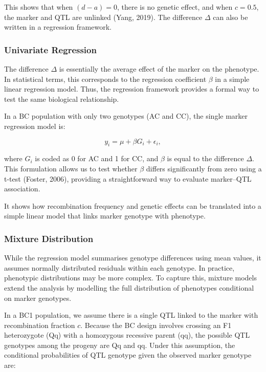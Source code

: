 \documentclass[
  letterpaper,
  DIV=11,
  numbers=noendperiod]{scrartcl}
\begin{document}
This shows that when \((d-a)=0\), there is no genetic effect, and when
\(c=0.5\), the marker and QTL are unlinked (Yang, 2019). The difference
\(\Delta\) can also be written in a regression framework.

\subsubsection{Univariate Regression}\label{univariate-regression}

The difference \(\Delta\) is essentially the average effect of the
marker on the phenotype. In statistical terms, this corresponds to the
regression coefficient \(\beta\) in a simple linear regression model.
Thus, the regression framework provides a formal way to test the same
biological relationship.

In a BC population with only two genotypes (AC and CC), the single
marker regression model is:

\[
y_i = \mu + \beta G_i + \epsilon_i,
\]

where \(G_i\) is coded as 0 for AC and 1 for CC, and \(\beta\) is equal
to the difference \(\Delta\). This formulation allows us to test whether
\(\beta\) differs significantly from zero using a t-test (Foster, 2006),
providing a straightforward way to evaluate marker--QTL association.

It shows how recombination frequency and genetic effects can be
translated into a simple linear model that links marker genotype with
phenotype.

\subsubsection{Mixture Distribution}\label{mixture-distribution}

While the regression model summarises genotype differences using mean
values, it assumes normally distributed residuals within each genotype.
In practice, phenotypic distributions may be more complex. To capture
this, mixture models extend the analysis by modelling the full
distribution of phenotypes conditional on marker genotypes.

In a BC1 population, we assume there is a single QTL linked to the
marker with recombination fraction \(c\). Because the BC design involves
crossing an F1 heterozygote (Qq) with a homozygous recessive parent
(qq), the possible QTL genotypes among the progeny are Qq and qq. Under
this assumption, the conditional probabilities of QTL genotype given the
observed marker genotype are:
\end{document}
